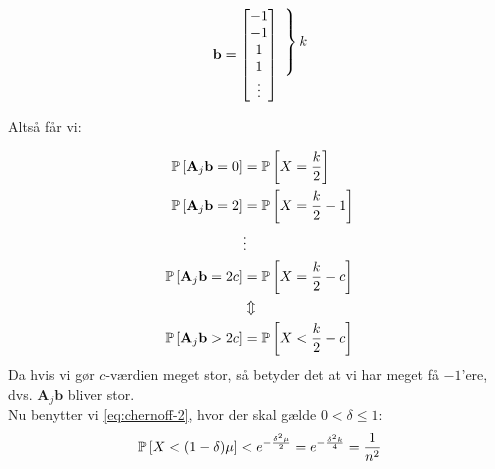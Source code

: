 \[
  \setlength{\arraycolsep}{0pt}
  \mathbf{b} =
    \left[
      \begin{array}{c}
        \begin{array}{c}
          -1 \\ -1 \\ 1 \\ 1
        \end{array} \\
        \begin{array}{c}
          \vdots
        \end{array}
      \end{array}
    \right]
  ~ %
  \begin{array}{c}
    \noleftdelimiter
    \vphantom{\begin{array}{c}
      -1 \\ -1 \\ 1 \\ 1
    \end{array}}
    \right\} k \\
    \vphantom{\begin{array}{c}
      \vdots
    \end{array}}
  \end{array}
\]


Altså får vi:

\begin{align}
  \P{\mathbf A_j \mathbf b = 0} &= \P{X = \frac{k}{2}} \nonumber \\
  \P{\mathbf A_j \mathbf b = 2} &= \P{X = \frac{k}{2} - 1} \nonumber \\
  &\vdots \nonumber \\
  \P{\mathbf A_j \mathbf b = 2c} &= \P{X = \frac{k}{2} - c} \nonumber \\
  &\Updownarrow \nonumber \\
  \P{\mathbf A_j \mathbf b > 2c} &= \P{X < \frac{k}{2} - c} \label{eq:moenster-prob}
\end{align}
Da hvis vi gør $c$-værdien meget stor, så betyder det at vi har meget få $-1$'ere, dvs. $\mathbf A_j \mathbf b$ bliver stor.\\

Nu benytter vi \cref{eq:chernoff-2}, hvor der skal gælde $0 < \delta \leq 1$:
\begin{align}
  \P{X < (1 - \delta) \mu } < e^{- \frac{\delta^2 \mu}{2} } = e^{- \frac{\delta^2 k}{4} } = \frac{1}{n^2} \label{eq:set-balance}
\end{align}

